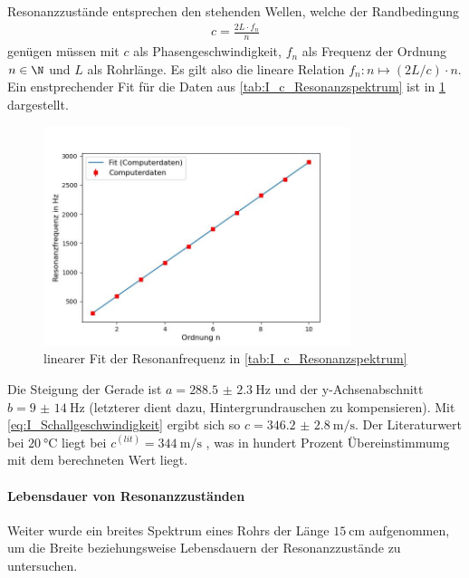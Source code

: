 \documentclass[../main.tex]{subfiles}
\begin{document}
        Resonanzzustände entsprechen den stehenden Wellen, welche der Randbedingung
        \begin{align}
            c = \frac{2 L\cdot f_n}{n}
            \label{eq:I_Schallgeschwindigkeit}
        \end{align}
        genügen müssen mit $c$ als Phasengeschwindigkeit, $f_n$ als Frequenz der Ordnung $n\in\N$ und $L$ als Rohrlänge. Es gilt also die lineare Relation $f_n: n\mapsto (2L/ c)\cdot n$. Ein enstprechender Fit für die Daten aus \ref{tab:I_c_Resonanzspektrum} ist in \ref{fig:I_Schallgeschwindigkeitfit} dargestellt.

        \begin{figure}[H]
            \centering
            \includegraphics[width=0.8\textwidth]{Bilddateien/Auswertung/I_Schallgeschwindigkeitfit.jpg}
            \caption{linearer Fit der Resonanfrequenz in \ref{tab:I_c_Resonanzspektrum}}
            \label{fig:I_Schallgeschwindigkeitfit}
        \end{figure}

        Die Steigung der Gerade ist $a=\SI{288.5(23)}{\hertz}$ und der y-Achsenabschnitt $b=\SI{9(14)}{\hertz}$ (letzterer dient dazu, Hintergrundrauschen zu kompensieren). Mit \eqref{eq:I_Schallgeschwindigkeit} ergibt sich so $c=\SI{346.2(28)}{\metre\per\second}$. Der Literaturwert bei $\SI{20}{\celsius}$ liegt bei $c^{(lit)}=\SI{344}{\metre\per\second}$ \cite{const:sound}, was in hundert Prozent Übereinstimmumg mit dem berechneten Wert liegt.

    \paragraph{Lebensdauer von Resonanzzuständen}
        Weiter wurde ein breites Spektrum eines Rohrs der Länge $\SI{15}{\centi\metre}$ aufgenommen, um die Breite beziehungsweise Lebensdauern der Resonanzzustände zu untersuchen.
\end{document}
